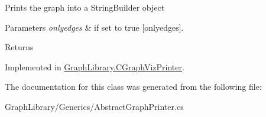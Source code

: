 Prints the graph into a String\+Builder object 


\begin{DoxyParams}{Parameters}
{\em onlyedges} & if set to {\ttfamily true} \mbox{[}onlyedges\mbox{]}.\\
\hline
\end{DoxyParams}
\begin{DoxyReturn}{Returns}

\end{DoxyReturn}


Implemented in \hyperlink{class_graph_library_1_1_c_graph_viz_printer_a5341d69647f313d81387578a629d1ed5}{Graph\+Library.\+C\+Graph\+Viz\+Printer}.



The documentation for this class was generated from the following file\+:\begin{DoxyCompactItemize}
\item 
Graph\+Library/\+Generics/Abstract\+Graph\+Printer.\+cs\end{DoxyCompactItemize}
